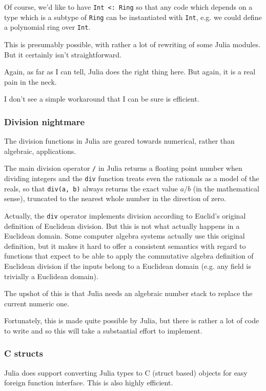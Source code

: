 \documentclass[a4paper,10pt]{article}
\newcommand{\code}{\lstinline}
\begin{document}
Of course, we'd like to have \code{Int <: Ring} so that any code which depends on a type which is a subtype
of \code{Ring} can be instantiated with \code{Int}, e.g. we could define a polynomial ring over \code{Int}.

This is presumably possible, with rather a lot of rewriting of some Julia modules. But it certainly isn't
straightforward.

Again, as far as I can tell, Julia does the right thing here. But again, it is a real pain in the neck.

I don't see a simple workaround that I can be sure is efficient.

\subsubsection{Division nightmare}

The division functions in Julia are geared towards numerical, rather than algebraic, applications.

The main division operator \code{/} in Julia returns a floating point number when dividing integers
and the \code{div} function treats even the rationals as a model of the reals, so that \code{div(a, b)}
always returns the exact value $a/b$ (in the mathematical sense), truncated to the nearest whole
number in the direction of zero.

Actually, the \code{div} operator implements division according to Euclid's original definition of
Euclidean division. But this is not what actually happens in a Euclidean domain. Some computer algebra
systems actually use this original definition, but it makes it hard to offer a consistent semantics
with regard to functions that expect to be able to apply the commutative algebra definition of Euclidean
division if the inputs belong to a Euclidean domain (e.g. any field is trivially a Euclidean domain).

The upshot of this is that Julia needs an algebraic number stack to replace the current numeric one.

Fortunately, this is made quite possible by Julia, but there is rather a lot of code to write and so
this will take a substantial effort to implement. 

\subsubsection{C structs}

Julia does support converting Julia types to C (struct based) objects for easy foreign function
interface. This is also highly efficient.
\end{document}
